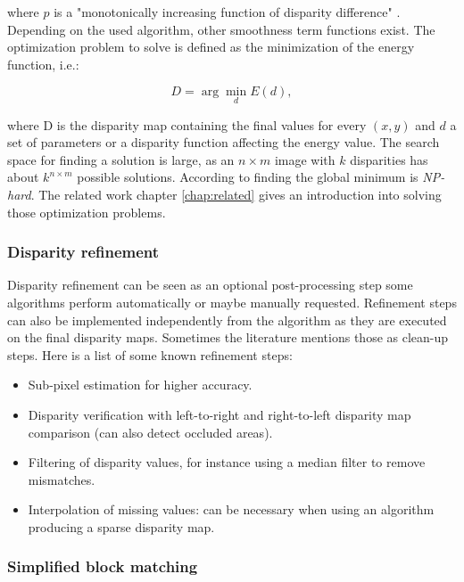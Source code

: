 \noindent where  $p$ is a "monotonically increasing function of disparity difference" \citep{scharstein2002taxonomy}.
Depending on the used algorithm, other smoothness term functions exist.
The optimization problem to solve is defined as the minimization of the energy function, i.e.:

\begin{equation}
  D = \arg\min_{d} E(d),
\end{equation}

\noindent where D is the disparity map containing the final values for every $(x,y)$ and $d$ a set of parameters or a disparity function affecting the energy value.
\newline\newline\noindent The search space for finding a solution is large, as an $n \times m$ image with $k$ disparities has about $k^{n \times m}$ possible solutions.
According to \citeauthor{scharstein2002taxonomy, cyganek2011introduction} finding the global minimum is \textit{NP-hard}.
The related work chapter \ref{chap:related} gives an introduction into solving those optimization problems.

\subsubsection{Disparity refinement}

Disparity refinement can be seen as an optional post-processing step some algorithms perform automatically or maybe manually requested.
Refinement steps can also be implemented independently from the algorithm as they are executed on the final disparity maps.
Sometimes the literature mentions those as clean-up steps.
Here is a list of some known refinement steps:

\begin{itemize}
  \item Sub-pixel estimation for higher accuracy.
  \item Disparity verification with left-to-right and right-to-left disparity map comparison (can also detect occluded areas).
  \item Filtering of disparity values, for instance using a median filter to remove mismatches.
  \item Interpolation of missing values: can be necessary when using an algorithm producing a sparse disparity map.
\end{itemize}

\subsubsection{Simplified block matching}

